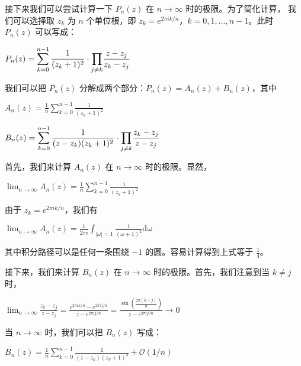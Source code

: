 \documentclass[12pt, a4paper, oneside]{article}
\begin{document}
\begin{spacing}{2.0}
接下来我们可以尝试计算一下 $P_n(z)$ 在 $n \to \infty$ 时的极限。为了简化计算，
我们可以选择取 $z_k$ 为 $n$ 个单位根，即 $z_k = e^{2 \pi i k/n}$，$k = 0, 1, \ldots, n-1$。此时 $P_n(z)$ 可以写成：
\begin{center}
    $P_n(z) = \displaystyle\sum_{k = 0}^{n-1}\frac{1}{(z_k + 1)^2} \cdot {\textstyle \displaystyle\prod_{j\neq k}}\frac{z - z_j}{z_k - z_j} $
\end{center}
我们可以把 $P_n(z)$ 分解成两个部分：$P_n(z) = A_n(z) + B_n(z)$，其中

\begin{center}
    $A_n(z) = \frac{1}{n}\displaystyle\sum_{k = 0}^{n-1}\frac{1}{(z_k + 1)^2}$
\end{center}

\begin{center}
    $B_n(z) = \displaystyle\sum_{k = 0}^{n-1}\frac{1}{(z - z_k)(z_k + 1)^2}\cdot {\textstyle \displaystyle\prod_{j\neq k}}\frac{z_k - z_j}{z - z_j} $
\end{center}

首先，我们来计算 $A_n(z)$ 在 $n \to \infty$ 时的极限。显然，
\begin{center}
    $\displaystyle\lim_{n\to \infty}A_n(z) = \frac{1}{n}\displaystyle\sum_{k = 0}^{n-1}\frac{1}{(z_k + 1)^2}$
\end{center}
由于 $z_k = e^{2 \pi i k/n}$，我们有
\begin{center}
    $\displaystyle\lim_{n\to \infty}A_n(z) = \frac{1}{2\pi i}\displaystyle\int_{|\omega| = 1}\frac{1}{(\omega + 1)^2}\mathrm{d\omega}$
\end{center}

其中积分路径可以是任何一条围绕 $-1$ 的圆。容易计算得到上式等于 $\frac{1}{4}$。

接下来，我们来计算 $B_n(z)$ 在 $n \to \infty$ 时的极限。首先，我们注意到当 $k \neq j$ 时，


\begin{center}
    $\displaystyle\lim_{n\to \infty}\frac{z_k - z_j}{z - z_j} = \frac{e^{2\pi ik/n}-e^{2\pi ij/n}}{z - e^{2\pi ij/n}} = \frac{\sin(\frac{2\pi (k-j)}{n})}{z - e^{2\pi ij/n}}\to 0$
\end{center}

当 $n \to \infty$ 时，我们可以把 $B_n(z)$ 写成：

\begin{center}
    $B_n(z) = \frac{1}{n}\displaystyle\sum_{k = 0}^{n-1}\frac{1}{(z - z_k)(z_k + 1)^2} + \mathcal{O}(1/n)$
\end{center}


\end{spacing}
\end{document}
